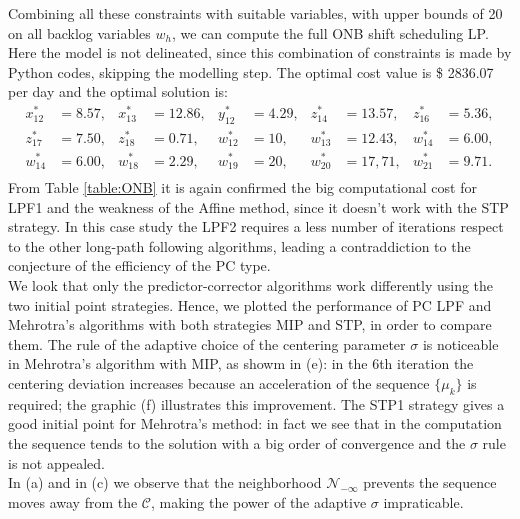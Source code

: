 \documentclass[a4paper,10 pt,titlepage,twoside]{book}
\theoremstyle{plain}
\theoremstyle{definition}
\theoremstyle{remark}
\begin{document}
Combining all these constraints with suitable variables, with upper bounds of 20 on all backlog variables $w_{h}$, we can compute the full ONB shift scheduling LP. Here the model is not delineated, since this combination of constraints is made by Python codes, skipping the modelling step. The optimal cost value is \$ 2836.07 per day and the optimal solution is:
\begin{align*}
x_{12}^{*} &=  8.57, & x_{13}^{*}&=  12.86, & y_{12}^{*} &= 4.29, & z_{14}^{*} &= 13.57, &z_{16}^{*} &= 5.36,\\
z_{17}^{*} &= 7.50, & z_{18}^{*}&= 0.71,  & w_{12}^{*} &= 10, & w_{13}^{*} &= 12.43, &w_{14}^{*} &=  6.00,\\
w_{14}^{*} &=  6.00, & w_{18}^{*}&=  2.29, & w_{19}^{*} &= 20, & w_{20}^{*} &= 17,71, &w_{21}^{*} &= 9.71.\\
\end{align*}
From Table \ref{table:ONB} it is again confirmed the big computational cost for LPF1 and the weakness of the Affine method, since it doesn't work with the STP strategy. In this case study the LPF2 requires a less number of iterations respect to the other long-path following algorithms, leading a contraddiction to the conjecture of the efficiency of the PC type.\\ 
We look that only the predictor-corrector algorithms work differently using the two initial point strategies.
Hence, we plotted the performance of PC LPF and Mehrotra's algorithms with both strategies MIP and STP, in order to compare them. The rule of the adaptive choice of the centering parameter $\sigma$ is noticeable in Mehrotra's algorithm with MIP, as showm in (e): in the 6th iteration the centering deviation increases because an acceleration of the sequence $\{\mu_{k}\}$ is required; the graphic (f) illustrates this improvement. The STP1 strategy gives a good initial point for Mehrotra's method: in fact we see that in the computation the sequence tends to the solution with a big order of convergence and the $\sigma$ rule is not appealed.\\
In (a) and in (c) we observe that the neighborhood $\mathcal{N}_{-\infty}$ prevents the sequence moves away from the $\mathcal{C}$, making the power of the adaptive $\sigma$ impraticable.\\  
\end{document}
